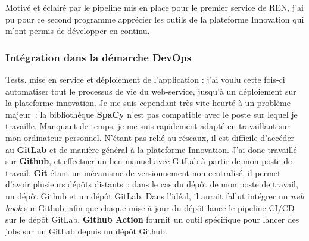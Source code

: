 Motivé et éclairé par le pipeline mis en place pour le premier service de REN, j'ai pu pour ce second programme apprécier les outils de la plateforme Innovation qui m'ont permis de développer en continu.
\label{section 3.2.2 - React}

\subsubsection{Intégration dans la démarche DevOps}
Tests, mise en service et déploiement de l'application : j'ai voulu cette fois-ci automatiser tout le processus de vie du web-service, jusqu'à un déploiement sur la plateforme innovation. Je me suis cependant très vite heurté à un problème majeur~: la bibliothèque \textbf{SpaCy} n'est pas compatible avec le poste sur lequel je travaille. Manquant de temps, je me suis rapidement adapté en travaillant sur mon ordinateur personnel. N'étant pas relié au réseaux, il est difficile d'accéder au \textbf{GitLab} et de manière général à la plateforme Innovation. J'ai donc travaillé sur \textbf{Github}, et effectuer un lien manuel avec GitLab à partir de mon poste de travail. \textbf{Git} étant un mécanisme de versionnement non centralisé, il permet d'avoir plusieurs dépôts distants~: dans le cas du dépôt de mon poste de travail, un dépôt Github et un dépôt GitLab. Dans l'idéal, il aurait fallut intégrer un \textit{web hook} sur Github, afin que chaque mise à jour du dépôt lance le pipeline CI/CD sur le dépôt GitLab. \textbf{Github Action} fournit un outil spécifique pour lancer des jobs sur un GitLab depuis un dépôt Github.
\newline

